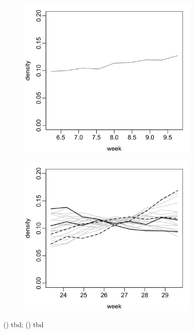 \documentclass{uwstat572}
\begin{document}
\begin{figure}[H]
	\centering
	\begin{subfigure}[b]{0.49\textwidth}
		\includegraphics[width=\textwidth]{figures/figure_3a.png}
		\caption{}
		\label{fig:first_infections}
	\end{subfigure}
	\hfill
	\begin{subfigure}[b]{0.49\textwidth}
		\includegraphics[width=\textwidth]{figures/figure_3b.png}
		\caption{}
		\label{fig:last_infections}
	\end{subfigure}
	\caption{() tbd; () tbd }
	\label{fig:time_plots}
\end{figure} 
\end{document}
